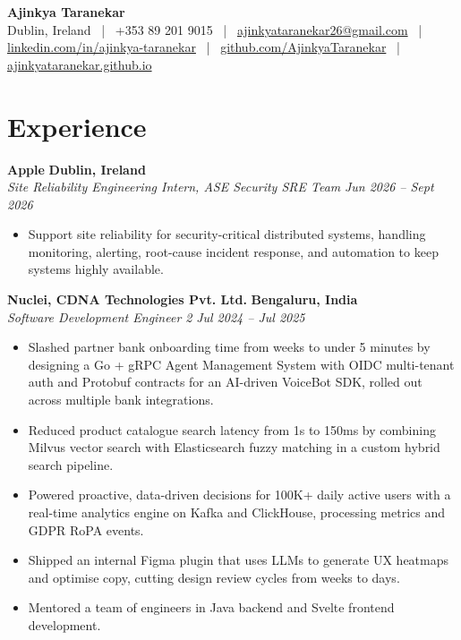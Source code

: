 \documentclass[10pt,letterpaper]{article}
\newcommand{\resumeHeading}[4]{
    {\textbf{#1} \hfill \textbf{#2}} \\[0.5pt]
    {\textit{#3} \hfill \textit{#4}}
}
\begin{document}
\begin{center}
    {\fontsize{14}{18}\selectfont\textbf{Ajinkya Taranekar}} \\[2pt]
    {\small Dublin, Ireland ~|~ +353 89 201 9015 ~|~
    \href{mailto:ajinkyataranekar26@gmail.com}{ajinkyataranekar26@gmail.com} ~|~
    \href{https://linkedin.com/in/ajinkya-taranekar}{linkedin.com/in/ajinkya-taranekar} ~|~
    \href{https://github.com/AjinkyaTaranekar}{github.com/AjinkyaTaranekar} ~|~
    \href{https://ajinkyataranekar.github.io}{ajinkyataranekar.github.io}}
\end{center}

\section{Experience}

\resumeHeading
{Apple}{Dublin, Ireland}
{Site Reliability Engineering Intern, ASE Security SRE Team}{Jun 2026 -- Sept 2026}
\begin{itemize}
    \item Support site reliability for security-critical distributed systems, handling monitoring, alerting, root-cause incident response, and automation to keep systems highly available.
\end{itemize}

\resumeHeading
{Nuclei, CDNA Technologies Pvt. Ltd.}{Bengaluru, India}
{Software Development Engineer 2}{Jul 2024 -- Jul 2025}
\begin{itemize}
    \item Slashed partner bank onboarding time from weeks to under 5 minutes by designing a Go + gRPC Agent Management System with OIDC multi-tenant auth and Protobuf contracts for an AI-driven VoiceBot SDK, rolled out across multiple bank integrations.
    \item Reduced product catalogue search latency from 1s to 150ms by combining Milvus vector search with Elasticsearch fuzzy matching in a custom hybrid search pipeline.
    \item Powered proactive, data-driven decisions for 100K+ daily active users with a real-time analytics engine on Kafka and ClickHouse, processing metrics and GDPR RoPA events.
    \item Shipped an internal Figma plugin that uses LLMs to generate UX heatmaps and optimise copy, cutting design review cycles from weeks to days.
    \item Mentored a team of engineers in Java backend and Svelte frontend development.
\end{itemize}
\end{document}

